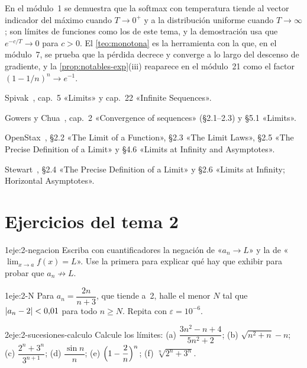 \begin{observacion}
En el módulo~1 se demuestra que la softmax con temperatura tiende al vector indicador del máximo cuando $T\to0^{+}$ y a la distribución uniforme cuando $T\to\infty$; son límites de funciones como los de este tema, y la demostración usa que $e^{-c/T}\to0$ para $c>0$. El \cref{teo:monotona} es la herramienta con la que, en el módulo~7, se prueba que la pérdida decrece y converge a lo largo del descenso de gradiente, y la \cref{prop:notables-exp}(iii) reaparece en el módulo~21 como el factor $(1-1/n)^{n}\to e^{-1}$.
\end{observacion}

\begin{lecturas}
\item Spivak~\cite{spivak}, cap.~5 «Limits» y cap.~22 «Infinite Sequences».
\item Gowers y Chua~\cite{cambA1}, cap.~2 «Convergence of sequences» (§2.1--2.3) y §5.1 «Limits».
\item OpenStax~\cite{osc1}, §2.2 «The Limit of a Function», §2.3 «The Limit Laws», §2.5 «The Precise Definition of a Limit» y §4.6 «Limits at Infinity and Asymptotes».
\item Stewart~\cite{stewart}, §2.4 «The Precise Definition of a Limit» y §2.6 «Limits at Infinity; Horizontal Asymptotes».
\end{lecturas}

\section*{Ejercicios del tema 2}

\begin{ejercicio}{1}{eje:2-negacion}
Escriba con cuantificadores la negación de «$a_n\to L$» y la de «$\lim_{x\to a}f(x)=L$». Use la primera para explicar qué hay que exhibir para probar que $a_n\not\to L$.
\end{ejercicio}

\begin{ejercicio}{1}{eje:2-N}
Para $a_n=\dfrac{2n}{n+3}$, que tiende a~2, halle el menor $N$ tal que $\lvert a_n-2\rvert<0{,}01$ para todo $n\ge N$. Repita con $\varepsilon=10^{-6}$.
\end{ejercicio}

\begin{ejercicio}{2}{eje:2-sucesiones-calculo}
Calcule los límites: (a) $\dfrac{3n^{2}-n+4}{5n^{2}+2}$; (b) $\sqrt{n^{2}+n}-n$; (c) $\dfrac{2^{n}+3^{n}}{3^{n+1}}$; (d) $\dfrac{\sin n}{n}$; (e) $\Bigl(1-\dfrac{2}{n}\Bigr)^{n}$; (f) $\sqrt[n]{2^{n}+3^{n}}$.
\end{ejercicio}

